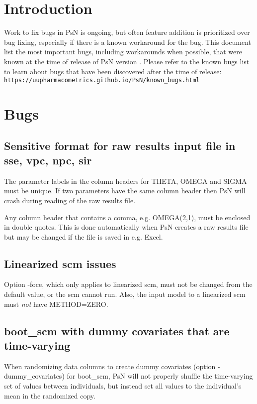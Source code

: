 




\maketitle

\section{Introduction}
Work to fix bugs in PsN is ongoing, but often feature addition is prioritized over bug fixing, especially if there is a known workaround for the bug. This document list the most important bugs, including workarounds when possible, that were known at the time of release of PsN version \psnversion. Please refer to the known bugs list to learn about bugs that have been discovered after the time of release:\\
\texttt{https://uupharmacometrics.github.io/PsN/known\_bugs.html}   

\section{Bugs}
\subsection{Sensitive format for raw results input file in sse, vpc, npc, sir}
The parameter labels in the column headers for THETA, OMEGA and SIGMA must be unique. If two parameters have the same
column header then PsN will crash during reading of the raw results file.

Any column header that contains a comma, e.g. OMEGA(2,1), must be enclosed in double quotes. This is done automatically when PsN creates a raw results file but may be changed if the file is saved in e.g. Excel.

\subsection{Linearized scm issues}
Option -foce, which only applies to linearized scm, must not be changed from the default value, or the scm cannot run. Also, the input model to a linearized scm must \emph{not} have METHOD=ZERO.

\subsection{boot\_scm with dummy covariates that are time-varying}
When randomizing data columns to create dummy covariates (option -dummy\_covariates) for boot\_scm, PsN will not properly
shuffle the time-varying set of values between individuals, but instead set all values to the individual's mean in the randomized copy.

